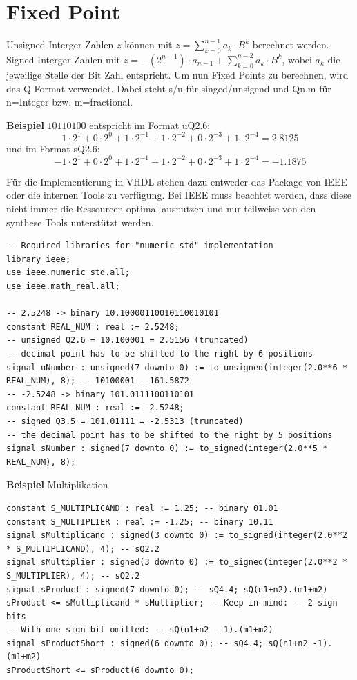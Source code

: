 \section{Fixed Point}
Unsigned Interger Zahlen $z$ können mit $z=\sum_{k=0}^{n-1}a_k\cdot B^k$ berechnet werden. Signed Interger Zahlen mit $z=-(2^{n-1})\cdot a_{n-1}+\sum_{k=0}^{n-2}a_k\cdot B^k$, wobei $a_k$ die jeweilige Stelle der Bit Zahl entspricht. Um nun Fixed Points zu berechnen, wird das Q-Format verwendet. Dabei steht s/u für singed/unsigend und Qn.m für n=Integer bzw. m=fractional.

\textbf{Beispiel} $10110100$ entspricht im Format uQ2.6:
\[
1\cdot 2^1 + 0\cdot2^0 + 1\cdot2^{-1}+ 1\cdot2^{-2}+ 0\cdot2^{-3}+ 1\cdot2^{-4} = 2.8125
\]
und im Format sQ2.6:
\[
-1\cdot 2^1 + 0\cdot2^0 + 1\cdot2^{-1}+ 1\cdot2^{-2}+ 0\cdot2^{-3}+ 1\cdot2^{-4} = -1.1875
\]

Für die Implementierung in VHDL stehen dazu entweder das Package von IEEE oder die internen Tools zu verfügung. Bei IEEE muss beachtet werden, dass diese nicht immer die Ressourcen optimal ausnutzen und nur teilweise von den synthese Tools unterstützt werden.

\begin{lstlisting}
-- Required libraries for "numeric_std" implementation
library ieee;
use ieee.numeric_std.all;
use ieee.math_real.all;

-- 2.5248 -> binary 10.10000110010110010101
constant REAL_NUM : real := 2.5248;
-- unsigned Q2.6 = 10.100001 = 2.5156 (truncated)
-- decimal point has to be shifted to the right by 6 positions
signal uNumber : unsigned(7 downto 0) := to_unsigned(integer(2.0**6 * REAL_NUM), 8); -- 10100001 --161.5872
-- -2.5248 -> binary 101.0111100110101
constant REAL_NUM : real := -2.5248;
-- signed Q3.5 = 101.01111 = -2.5313 (truncated)
-- the decimal point has to be shifted to the right by 5 positions
signal sNumber : signed(7 downto 0) := to_signed(integer(2.0**5 * REAL_NUM), 8);
\end{lstlisting}

\textbf{Beispiel} Multiplikation
\begin{lstlisting}
constant S_MULTIPLICAND : real := 1.25; -- binary 01.01
constant S_MULTIPLIER : real := -1.25; -- binary 10.11
signal sMultiplicand : signed(3 downto 0) := to_signed(integer(2.0**2 * S_MULTIPLICAND), 4); -- sQ2.2
signal sMultiplier : signed(3 downto 0) := to_signed(integer(2.0**2 * S_MULTIPLIER), 4); -- sQ2.2
signal sProduct : signed(7 downto 0); -- sQ4.4; sQ(n1+n2).(m1+m2)
sProduct <= sMultiplicand * sMultiplier; -- Keep in mind: -- 2 sign bits
-- With one sign bit omitted: -- sQ(n1+n2 - 1).(m1+m2)
signal sProductShort : signed(6 downto 0); -- sQ4.4; sQ(n1+n2 -1).(m1+m2)
sProductShort <= sProduct(6 downto 0);
\end{lstlisting}


